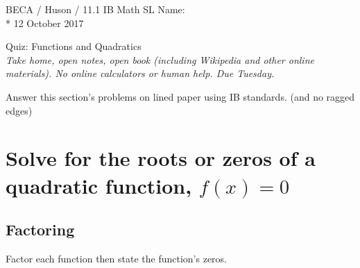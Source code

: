 \documentclass[]{book}
\begin{document}
\noindent BECA / Huson / 11.1 IB Math SL \hspace{2in} Name:\\*
12 October 2017
\begin{center}
{\Large Quiz: Functions and Quadratics}\\
\textit{Take home, open notes, open book (including Wikipedia and other online materials). No online calculators or human help. Due Tuesday.}
\end{center}

Answer this section's problems on lined paper using IB standards. (and no ragged edges)

\section*{Solve for the roots or zeros of a quadratic function, $f(x)=0$}

\subsection*{Factoring}

Factor each function then state the function's zeros.
\end{document}
